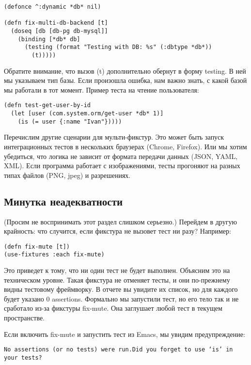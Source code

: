 \begin{verbatim}
(defonce ^:dynamic *db* nil)

(defn fix-multi-db-backend [t]
  (doseq [db [db-pg db-mysql]]
    (binding [*db* db]
      (testing (format "Testing with DB: %s" (:dbtype *db*))
        (t)))))
\end{verbatim}

Обратите внимание, что вызов (t) дополнительно обернут в форму testing. В ней мы
указываем тип базы. Если произошла ошибка, нам важно знать, с какой базой мы
работали в тот момент. Пример теста на чтение пользователя:

\begin{verbatim}
(defn test-get-user-by-id
  (let [user (com.system.orm/get-user *db* 1)]
    (is (= user {:name "Ivan"}))))
\end{verbatim}

Перечислим другие сценарии для мульти-фикстур. Это может быть запуск
интеграционных тестов в нескольких браузерах (Chrome, Firefox). Или мы хотим
убедиться, что логика не зависит от формата передачи данных (JSON, YAML,
XML). Если программа работает с изображениями, тесты прогоняют на разных типах
файлов (PNG, jpeg) и разрешениях.

\subsection{Минутка неадекватности}

(Просим не воспринимать этот раздел слишком серьезно.) Перейдем в другую
крайность: что случится, если фикстура не вызовет тест ни разу? Например:

\begin{verbatim}
(defn fix-mute [t])
(use-fixtures :each fix-mute)
\end{verbatim}

Это приведет к тому, что ни один тест не будет выполнен. Объясним это на
техническом уровне. Такая фикстура не отменяет тесты, и они по-прежнему видны
тестовому фреймворку. В отчете вы увидите их список, но для каждого будет
указано 0 assertions. Формально мы запустили тест, но его тело так и не
сработало из-за фикстуры fix-mute. Она заглушает любой тест в текущем
пространстве.

Если включить fix-mute и запустить тест из Emacs, мы увидим предупреждение:

\begin{verbatim}
No assertions (or no tests) were run.Did you forget to use ‘is’ in your tests?
\end{verbatim}

